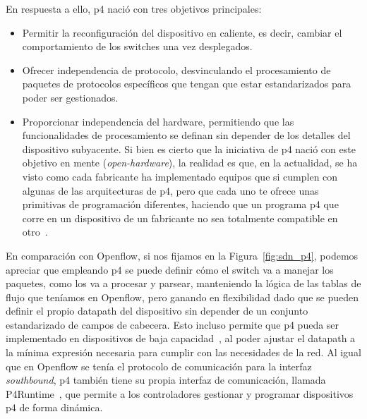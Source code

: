 En respuesta a ello, \gls{p4} nació con tres objetivos principales: 

\begin{itemize}
    \item Permitir la reconfiguración del dispositivo en caliente, es decir, cambiar el comportamiento de los switches una vez desplegados.
    
    \item Ofrecer independencia de protocolo, desvinculando el procesamiento de paquetes de protocolos específicos que tengan que estar estandarizados para poder ser gestionados.
    
    \item Proporcionar independencia del hardware, permitiendo que las funcionalidades de procesamiento se definan sin depender de los detalles del dispositivo subyacente. Si bien es cierto que la iniciativa de \gls{p4} nació con este objetivo en mente (\textit{open-hardware}), la realidad es que, en la actualidad, se ha visto como cada fabricante ha implementado equipos que si cumplen con algunas de las arquitecturas de \gls{p4}, pero que cada uno te ofrece unas primitivas de programación diferentes, haciendo que un programa \gls{p4} que corre en un dispositivo de un fabricante no sea totalmente compatible en otro~\cite{hauser2023survey}. 
\end{itemize}

En comparación con Openflow, si nos fijamos en la Figura~\ref{fig:sdn_p4}, podemos apreciar que empleando \gls{p4} se puede definir cómo el switch va a manejar los paquetes, como los va a procesar y parsear, manteniendo la lógica de las tablas de flujo que teníamos en Openflow, pero ganando en flexibilidad dado que se pueden definir el propio datapath del dispositivo sin depender de un conjunto estandarizado de campos de cabecera. Esto incluso permite que \gls{p4} pueda ser implementado en dispositivos de baja capacidad~\cite{carrascal2020analysis}, al poder ajustar el datapath a la mínima expresión necesaria para cumplir con las necesidades de la red. Al igual que en Openflow se tenía el protocolo de comunicación para la interfaz \textit{southbound}, \gls{p4} también tiene su propia interfaz de comunicación, llamada P4Runtime~\cite{p4runtime2023}, que permite a los controladores gestionar y programar dispositivos \gls{p4} de forma dinámica. 

